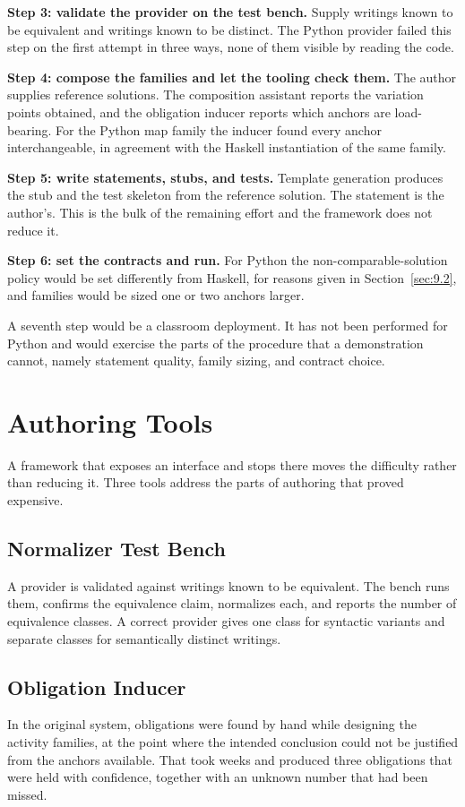 \documentclass[journal]{IEEEtran}
\begin{document}
\textbf{Step 3: validate the provider on the test bench.} Supply writings known to be equivalent and writings known to be distinct. The Python provider failed this step on the first attempt in three ways, none of them visible by reading the code.

\textbf{Step 4: compose the families and let the tooling check them.} The author supplies reference solutions. The composition assistant reports the variation points obtained, and the obligation inducer reports which anchors are load-bearing. For the Python map family the inducer found every anchor interchangeable, in agreement with the Haskell instantiation of the same family.

\textbf{Step 5: write statements, stubs, and tests.} Template generation produces the stub and the test skeleton from the reference solution. The statement is the author's. This is the bulk of the remaining effort and the framework does not reduce it.

\textbf{Step 6: set the contracts and run.} For Python the non-comparable-solution policy would be set differently from Haskell, for reasons given in Section~\ref{sec:9.2}, and families would be sized one or two anchors larger.

A seventh step would be a classroom deployment. It has not been performed for Python and would exercise the parts of the procedure that a demonstration cannot, namely statement quality, family sizing, and contract choice.

\section{Authoring Tools}\label{sec:7}
A framework that exposes an interface and stops there moves the difficulty rather than reducing it. Three tools address the parts of authoring that proved expensive.

\subsection{Normalizer Test Bench}\label{sec:7.1}
A provider is validated against writings known to be equivalent. The bench runs them, confirms the equivalence claim, normalizes each, and reports the number of equivalence classes. A correct provider gives one class for syntactic variants and separate classes for semantically distinct writings.

\subsection{Obligation Inducer}\label{sec:7.2}
In the original system, obligations were found by hand while designing the activity families, at the point where the intended conclusion could not be justified from the anchors available. That took weeks and produced three obligations that were held with confidence, together with an unknown number that had been missed.
\end{document}
